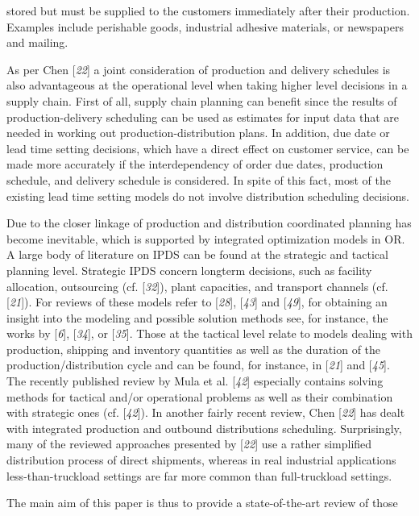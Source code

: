  stored but must be supplied to the customers immediately after their production.
 Examples include perishable goods, industrial adhesive materials, or newspapers and
 mailing.\par As per Chen [\textit{22}] a joint consideration of
 production and delivery schedules is also advantageous at the operational level when
 taking higher level decisions in a supply chain. First of all, supply chain planning can
 benefit since the results of production-delivery scheduling can be used as estimates for
 input data that are needed in working out production-distribution plans. In addition,
 due date or lead time setting decisions, which have a direct effect on customer service,
 can be made more accurately if the interdependency of order due dates, production
 schedule, and delivery schedule is considered. In spite of this fact, most of the
 existing lead time setting models do not involve distribution scheduling decisions.\par Due to the closer linkage of production and distribution coordinated planning has become
 inevitable, which is supported by integrated optimization models in OR. A large body of
 literature on IPDS can be found at the strategic and tactical planning level. Strategic
 IPDS concern longterm decisions, such as facility allocation, outsourcing (cf. [\textit{32}]), plant capacities, and transport channels (cf.
 [\textit{21}]). For reviews of these models refer to
 [\textit{28}], [\textit{43}] and [\textit{49}], for obtaining an insight
 into the modeling and possible solution methods see, for instance, the works by [\textit{6}], [\textit{34}], or
 [\textit{35}]. Those at the tactical level relate to
 models dealing with production, shipping and inventory quantities as well as the
 duration of the production/distribution cycle and can be found, for instance, in [\textit{21}] and [\textit{45}].
 The recently published review by Mula et al. [\textit{42}]
 especially contains solving methods for tactical and/or operational problems as well as
 their combination with strategic ones (cf. [\textit{42}]).
 In another fairly recent review, Chen [\textit{22}] has
 dealt with integrated production and outbound distributions scheduling. Surprisingly,
 many of the reviewed approaches presented by [\textit{22}]
 use a rather simplified distribution process of direct shipments, whereas in real
 industrial applications less-than-truckload settings are far more common than
 full-truckload settings.\par The main aim of this paper is thus to provide a state-of-the-art review of those
